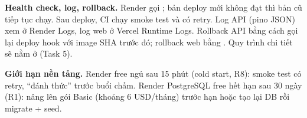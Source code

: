 \textbf{Health check, log, rollback.} Render gọi ; bản deploy mới không đạt thì bản cũ tiếp tục chạy.
Sau deploy, CI chạy smoke test  và  có retry. Log API (pino JSON) xem ở
Render Logs, log web ở Vercel Runtime Logs. Rollback API bằng cách gọi lại deploy hook với image SHA trước đó; rollback
web bằng . Quy trình chi tiết sẽ nằm ở  (Task 5).

\textbf{Giới hạn nền tảng.} Render free ngủ sau 15 phút (cold start, R8): smoke test có retry, ``đánh thức'' trước buổi
chấm. Render PostgreSQL free hết hạn sau 30 ngày (R1): nâng lên gói Basic (khoảng 6 USD/tháng) trước hạn hoặc tạo lại
DB rồi migrate + seed.
